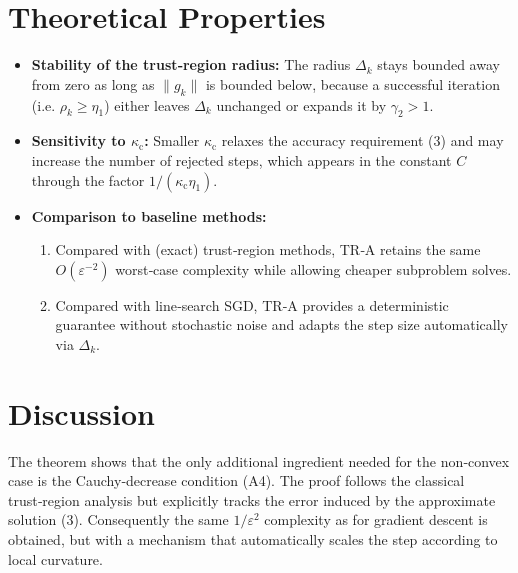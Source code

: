 \documentclass[11pt]{article}
\begin{document}
\section*{Theoretical Properties}
\begin{itemize}
\item \textbf{Stability of the trust‑region radius:} The radius $\Delta_{k}$ stays bounded away from zero as long as $\|g_{k}\|$ is bounded below, because a successful iteration (i.e. $\rho_{k}\ge\eta_{1}$) either leaves $\Delta_{k}$ unchanged or expands it by $\gamma_{2}>1$.
\item \textbf{Sensitivity to $\kappa_{\mathrm{c}}$:} Smaller $\kappa_{\mathrm{c}}$ relaxes the accuracy requirement (3) and may increase the number of rejected steps, which appears in the constant $C$ through the factor $1/(\kappa_{\mathrm{c}}\eta_{1})$.
\item \textbf{Comparison to baseline methods:}
    \begin{enumerate}
        \item Compared with (exact) trust‑region methods, TR‑A retains the same $O(\varepsilon^{-2})$ worst‑case complexity while allowing cheaper subproblem solves.
        \item Compared with line‑search SGD, TR‑A provides a deterministic guarantee without stochastic noise and adapts the step size automatically via $\Delta_{k}$.
    \end{enumerate}
\end{itemize}

\section*{Discussion}
The theorem shows that the only additional ingredient needed for the non‑convex case is the Cauchy‑decrease condition (A4).  The proof follows the classical trust‑region analysis but explicitly tracks the error induced by the approximate solution (3).  Consequently the same $1/\varepsilon^{2}$ complexity as for gradient descent is obtained, but with a mechanism that automatically scales the step according to local curvature.

\newpage
\end{document}
